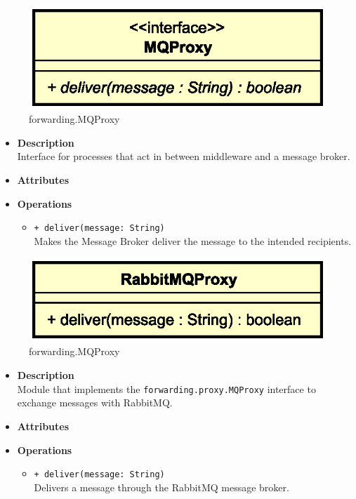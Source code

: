 
\begin{figure}[H]
  \centering
  \includegraphics[width=.45\columnwidth]{images/solution/mw/fwd/mqp.eps}
  \caption{forwarding.MQProxy}
  \label{fig:mw-forwarding-mqproxy}
\end{figure}

\FloatBarrier
\begin{itemize}
  \item \textbf{Description} \\
    Interface for processes that act in between middleware and a message
    broker.
  \item \textbf{Attributes}
  \item \textbf{Operations}
  \begin{itemize}
    \item \texttt{+ deliver(message: String)} \\
    Makes the Message Broker deliver the message to the intended recipients.
  \end{itemize}
\end{itemize}


\begin{figure}[H]
  \centering
  \includegraphics[width=.45\columnwidth]{images/solution/mw/fwd/rmqp.eps}
  \caption{forwarding.MQProxy}
  \label{fig:mw-forwarding-mqproxy}
\end{figure}

\FloatBarrier
\begin{itemize}
  \item \textbf{Description} \\
    Module that implements the \texttt{forwarding.proxy.MQProxy}
    interface to exchange messages with RabbitMQ.
  \item \textbf{Attributes}
  \item \textbf{Operations}
  \begin{itemize}
    \item \texttt{+ deliver(message: String)} \\
    Delivers a message through the RabbitMQ message broker.
  \end{itemize}
\end{itemize}

